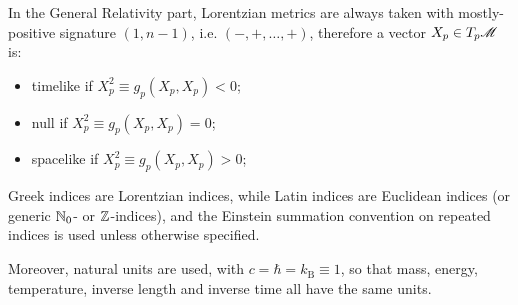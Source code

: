 
In the General Relativity part, Lorentzian metrics are always taken with mostly-positive signature $ (1 , n-1) $, i.e. $ (-,+,\dots,+) $, therefore a vector $ X_p \in T_p\mathscr{M} $ is:
\begin{itemize}
  \item timelike if $ X_p^2 \equiv g_p(X_p , X_p) < 0 $;
  \item null if $ X_p^2 \equiv g_p(X_p , X_p) = 0 $;
  \item spacelike if $ X_p^2 \equiv g_p(X_p , X_p) > 0 $;
\end{itemize}


Greek indices are Lorentzian indices, while Latin indices are Euclidean indices (or generic $ \mathbb{N}_0 $- or $ \mathbb{Z} $-indices), and the Einstein summation convention on repeated indices is used unless otherwise specified.

Moreover, natural units are used, with $ c = \hbar = k_\text{B} \equiv 1 $, so that mass, energy, temperature, inverse length and inverse time all have the same units.
